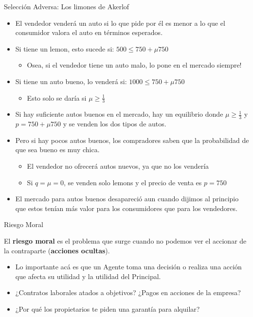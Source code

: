 \documentclass{beamer}
\begin{document}
\begin{frame}{Selección Adversa: Los limones de Akerlof}
    \begin{itemize}
    \item El vendedor venderá un auto si lo que pide por él es menor a lo que el consumidor valora el auto en términos esperados.
    \vspace{1mm}
    \item Si tiene un lemon, esto sucede si: $500\leq750+\mu750$
        \begin{itemize}
        \item Osea, si el vendedor tiene un auto malo, lo pone en el mercado siempre! 
        \end{itemize}
    \vspace{1mm}
    \item Si tiene un auto bueno, lo venderá si: 
    $1000 \leq 750 + \mu 750 $ 
        \begin{itemize}
        \item Esto solo se daría si $\mu \geq \frac{1}{3}$
        \end{itemize} 
    \item  Si hay suficiente autos buenos en el mercado, hay un equilibrio donde $\mu \geq \frac{1}{3}$ y $p= 750 + \mu 750$ y se venden los dos tipos de autos.     \vspace{1mm}
    \item Pero si hay pocos autos buenos, los compradores saben que la probabilidad de que sea bueno es muy chica.
    \begin{itemize}
    \item El vendedor no ofrecerá autos nuevos, ya que no los vendería
    \item Si $q= \mu = 0 $, se venden solo lemons y el precio de venta es $p= 750$ 
    \end{itemize}
    \item El mercado para autos buenos desapareció aun cuando dijimos al principio que estos tenían más valor para los consumidores que para los vendedores. 
    \end{itemize}   
\end{frame}

\begin{frame}{Riesgo Moral}
    \begin{boxB}
        \centering
        El \textbf{riesgo moral} es el problema que surge cuando no podemos ver el accionar de la contraparte (\textbf{acciones ocultas}).
    \end{boxB}
    \begin{itemize}
        \item Lo importante acá es que un Agente toma una decisión o realiza una acción que afecta su
        utilidad y la utilidad del Principal.
        \item ¿Contratos laborales atados a objetivos? ¿Pagos en acciones de la empresa?
        \item ¿Por qué los propietarios te piden una garantía para alquilar?
    \end{itemize}
    \centering
\end{frame}
\end{document}
